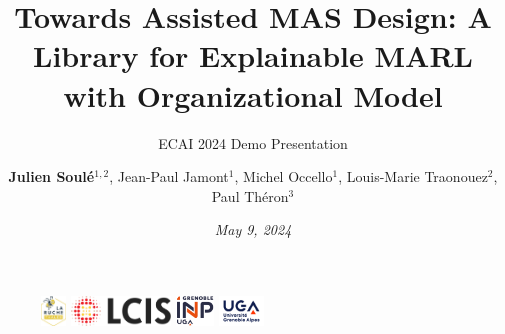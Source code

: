 \author{\textbf{Julien Soulé$^{1,2}$}, Jean-Paul Jamont$^1$, Michel Occello$^1$, Louis-Marie Traonouez$^2$, Paul Théron$^3$}

\title{\textbf{Towards Assisted MAS Design: A Library for
Explainable MARL with Organizational Model}}

\subtitle{ECAI 2024 Demo Presentation}




\date{\textit{\footnotesize May 9, 2024}}

\begin{frame}[plain]
	\maketitle\vspace{-0.8cm}
	\begin{figure}[ht!]
		\centering
            \includegraphics[height=0.8cm]{figures/la-ruche_logo.png}
            \hspace{0.8cm}
            \includegraphics[height=0.8cm]{figures/lcis_logo.png}
            \hspace{0.8cm}
		\includegraphics[height=0.8cm]{figures/grenoble-inp_logo.png}
            \hspace{0.8cm}
            \includegraphics[height=0.8cm]{figures/uga_logo.jpg}
	\end{figure}
\end{frame}